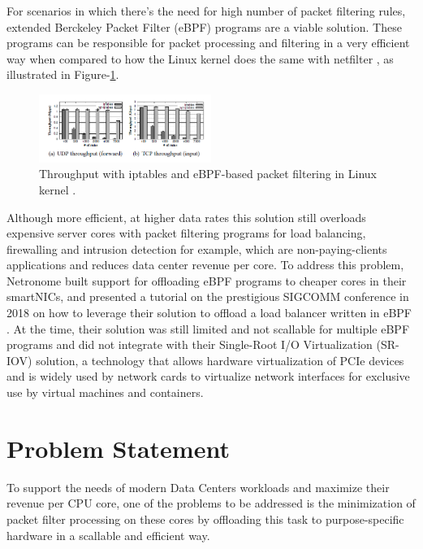 \documentclass[conference]{IEEEtran}
\begin{document}
For scenarios in which there's the need for high number of packet filtering rules, extended Berckeley Packet Filter (eBPF) programs are a viable solution. These programs can be responsible for packet processing and filtering in a very efficient way when compared to how the Linux kernel does the same with netfilter \cite{vieira:2020:fast-ebpf-xdp} \cite{miano:2018:ebpf-experience} \cite{bertrone:2018:ebpf-throughput}, as illustrated in Figure-\ref{fig:ebpf-throughput}.

\begin{figure}[h]
    \centering
    \includegraphics[width=0.5\textwidth]{figures/ebpf.png}
    \caption{ Throughput with iptables and eBPF-based packet filtering in Linux kernel \cite{bertrone:2018:ebpf-throughput}.}
    \label{fig:ebpf-throughput}
\end{figure}

Although more efficient, at higher data rates this solution still overloads expensive server cores with packet filtering programs for load balancing, firewalling and intrusion detection for example, which are non-paying-clients applications and reduces data center revenue per core. To address this problem, Netronome built support for offloading eBPF programs to cheaper cores in their smartNICs, and presented a tutorial on the prestigious SIGCOMM conference in 2018 on how to leverage their solution to offload a load balancer written in eBPF \cite{beckett:2018:ebpf-xdp}. At the time, their solution was still limited and not scallable for multiple eBPF programs and did not integrate with their Single-Root I/O Virtualization (SR-IOV) solution, a technology that allows hardware virtualization of PCIe devices and is widely used by network cards to virtualize network interfaces for exclusive use by virtual machines and containers.

\section{Problem Statement}
To support the needs of modern Data Centers workloads and maximize their revenue per CPU core, one of the problems to be addressed is the minimization of packet filter processing on these cores by offloading this task to purpose-specific hardware in a scallable and efficient way.
\end{document}
